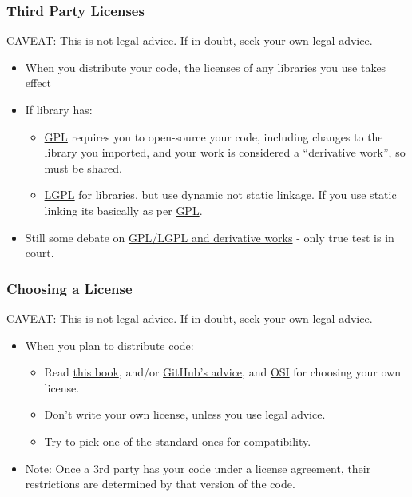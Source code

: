 \subsubsection{Third Party Licenses}\label{third-party-licenses-1}

CAVEAT: This is not legal advice. If in doubt, seek your own legal
advice.

\begin{itemize}
\itemsep1pt\parskip0pt
\item
  When you distribute your code, the licenses of any libraries you use
  takes effect
\item
  If library has:

  \begin{itemize}
  \itemsep1pt\parskip0pt
  \item
    \href{http://opensource.org/licenses/gpl-license}{GPL} requires you
    to open-source your code, including changes to the library you
    imported, and your work is considered a ``derivative work'', so must
    be shared.
  \item
    \href{http://opensource.org/licenses/lgpl-license}{LGPL} for
    libraries, but use dynamic not static linkage. If you use static
    linking its basically as per
    \href{http://opensource.org/licenses/gpl-license}{GPL}.
  \end{itemize}
\item
  Still some debate on \href{https://lwn.net/Articles/548216/}{GPL/LGPL
  and derivative works} - only true test is in court.
\end{itemize}

\subsubsection{Choosing a License}\label{choosing-a-license}

CAVEAT: This is not legal advice. If in doubt, seek your own legal
advice.

\begin{itemize}
\itemsep1pt\parskip0pt
\item
  When you plan to distribute code:

  \begin{itemize}
  \itemsep1pt\parskip0pt
  \item
    Read \href{http://www.oreilly.com/openbook/osfreesoft/book/}{this
    book}, and/or \href{http://choosealicense.com/}{GitHub's advice},
    and \href{http://opensource.org/}{OSI} for choosing your own
    license.
  \item
    Don't write your own license, unless you use legal advice.
  \item
    Try to pick one of the standard ones for compatibility.
  \end{itemize}
\item
  Note: Once a 3rd party has your code under a license agreement, their
  restrictions are determined by that version of the code.
\end{itemize}

